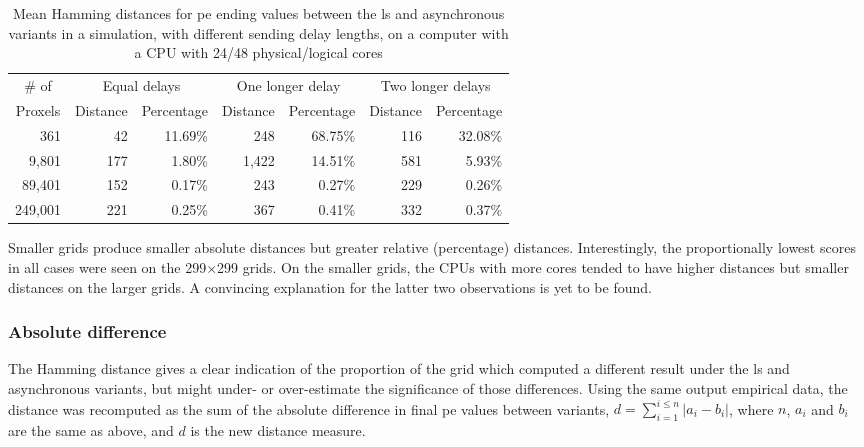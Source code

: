 \begin{table}
\centering
\begin{tabular}{@{}r|rr|rr|rr@{}}
\toprule
\multicolumn{1}{c|}{\# of}   & \multicolumn{2}{c|}{Equal delays} & \multicolumn{2}{c|}{One longer delay} & \multicolumn{2}{c}{Two longer delays} \\ \cmidrule(l){2-7} 
\multicolumn{1}{c|}{Proxels} & Distance     & Percentage     & Distance      & Percentage      & Distance      & Percentage      \\ \midrule
361  & 42  & 11.69\% & 248  & 68.75\% & 116  & 32.08\% \\
9,801  & 177  & 1.80\% & 1,422  & 14.51\% & 581  & 5.93\% \\
89,401  & 152  & 0.17\% & 243  & 0.27\% & 229  & 0.26\% \\
249,001  & 221  & 0.25\% & 367  & 0.41\% & 332  & 0.37\% \\ \bottomrule
\end{tabular}%
\caption[Mean Hamming distances for  ending values between the \gls{ls} and asynchronous variants on a 48-core CPU]{Mean Hamming distances for \gls{pe} ending values between the \gls{ls} and asynchronous variants in a simulation, with different sending delay lengths, on a computer with a CPU with 24/48 physical/logical cores}
\label{tab:nmp:hamming48cores}
\end{table}

Smaller grids produce smaller absolute distances but greater relative (percentage) distances.  Interestingly, the proportionally lowest scores in all cases were seen on the 299×299 grids.  On the smaller grids, the CPUs with more cores tended to have higher distances but smaller distances on the larger grids.  A convincing explanation for the latter two observations is yet to be found.

\subsubsection{Absolute difference}
The Hamming distance gives a clear indication of the proportion of the grid which computed a different result under the \gls{ls} and asynchronous variants, but might under- or over-estimate the significance of those differences.  Using the same output empirical data, the distance was recomputed as the sum of the absolute difference in final \gls{pe} values between variants, \ie{} \( d = \sum_{i = 1}^{i \leq n} |a_i - b_i| \), where \(n\), \(a_i\) and \(b_i\) are the same as above, and \(d\) is the new distance measure.

